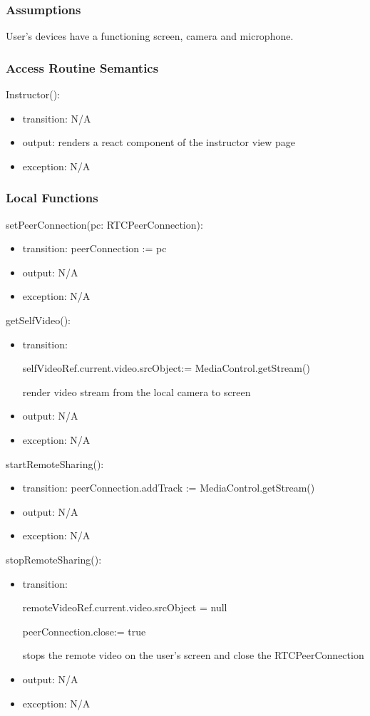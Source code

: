 \documentclass[12pt, titlepage]{article}
\begin{document}
\subsubsection{Assumptions}

User's devices have a functioning screen, camera and microphone.

\subsubsection{Access Routine Semantics}

\noindent Instructor():
\begin{itemize}
\item transition: N/A
\item output: renders a react component of the instructor view page
\item exception: N/A
\end{itemize}

\subsubsection{Local Functions}

\noindent setPeerConnection(pc: RTCPeerConnection):
\begin{itemize}
\item transition: peerConnection := pc
\item output: N/A
\item exception: N/A
\end{itemize}

\noindent getSelfVideo():
\begin{itemize}
\item transition:

  selfVideoRef.current.video.srcObject:= MediaControl.getStream()

  render video stream from the local camera to screen
\item output: N/A
\item exception: N/A
\end{itemize}

\noindent startRemoteSharing():
\begin{itemize}
\item transition: peerConnection.addTrack := MediaControl.getStream()
\item output: N/A
\item exception: N/A
\end{itemize}

\noindent stopRemoteSharing():
\begin{itemize}
\item transition:

  remoteVideoRef.current.video.srcObject = null

  peerConnection.close:= true

  stops the remote video on the user’s screen and close the RTCPeerConnection
\item output: N/A
\item exception: N/A
\end{itemize}
\end{document}
